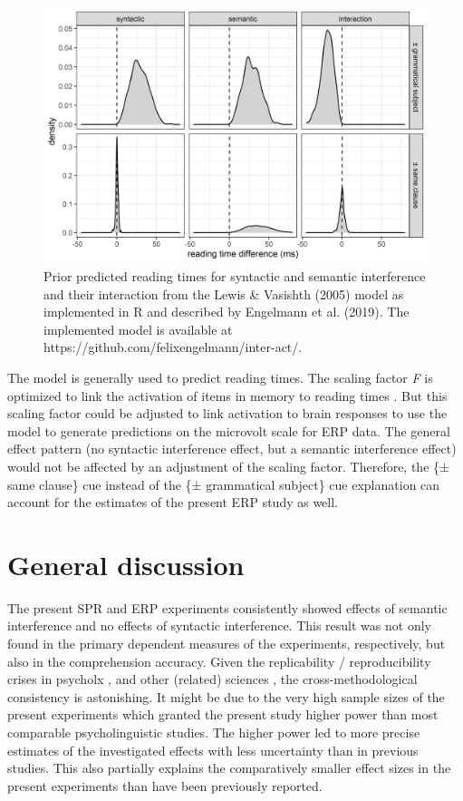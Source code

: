 \documentclass[a4paper, man, floatsintext]{apa7}
\begin{document}
\begin{figure}[H]
    \centering
    \caption{Prior predicted reading times for syntactic and semantic interference and their interaction from the Lewis \& Vasishth (2005) model as implemented in R and described by Engelmann et al. (2019). The implemented model is available at https://github.com/felixengelmann/inter-act/.}
    \label{fig:model_predictions}\includegraphics[width=\textwidth]{images/PriorPredicted_LV05_engelmann_effects_syncue.png}
\end{figure}

The \citet{Lewis2005} model is generally used to predict reading times. The scaling factor \textit{F} is optimized to link the activation of items in memory to reading times \citep{Lewis2005}. But this scaling factor could be adjusted to link activation to brain responses to use the model to generate predictions on the microvolt scale for ERP data. The general effect pattern (no syntactic interference effect, but a semantic interference effect) would not be affected by an adjustment of the scaling factor. Therefore, the \{± same clause\} cue instead of the \{± grammatical subject\} cue explanation can account for the estimates of the present ERP study as well.


\section{General discussion}
The present SPR and ERP experiments consistently showed effects of semantic interference and no effects of syntactic interference. This result was not only found in the primary dependent measures of the experiments, respectively, but also in the comprehension accuracy. Given the replicability / reproducibility crises in psycholx \citep[see e.g., ][]{vasishth2018_signficancefilter}, and other (related) sciences \citep[see e.g., ][]{openscience2015_reproducibility}, the cross-methodological consistency is astonishing. It might be due to the very high sample sizes of the present experiments which granted the present study higher power than most comparable psycholinguistic studies. The higher power led to more precise estimates of the investigated effects with less uncertainty than in previous studies. This also partially explains the comparatively smaller effect sizes in the present experiments than have been previously reported.
\end{document}
